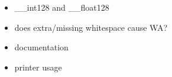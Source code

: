 \begin{itemize}[topsep=0pt,itemsep=0pt,leftmargin=4pt,rightmargin=0pt]
\item \_\_int128 and \_\_float128
\item does extra/missing whitespace cause WA?
\item documentation
\item printer usage
\end{itemize}